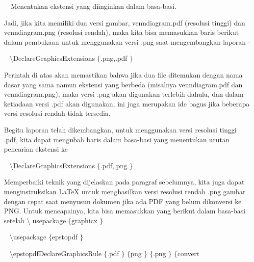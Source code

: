 \noindent 
 $  $ $  $ $  $ $  $Menentukan ekstensi yang diinginkan dalam basa-basi. \par
\vspace{12pt}
\noindent 
Jadi, jika kita memiliki dua versi gambar, venndiagram.pdf (resolusi tinggi) dan venndiagram.png (resolusi rendah), maka kita bisa memasukkan baris berikut dalam pembukaan untuk menggunakan versi .png saat mengembangkan laporan - \par
\vspace{28pt}
\noindent 
~  $  \setminus $DeclareGraphicsExtensions $  \{  $.png,.pdf $  \}  $ \par
\noindent 
Perintah di atas akan memastikan bahwa jika dua file ditemukan dengan nama dasar yang sama namun ekstensi yang berbeda (misalnya venndiagram.pdf dan venndiagram.png), maka versi .png akan digunakan terlebih dahulu, dan dalam ketiadaan versi .pdf akan digunakan, ini juga merupakan ide bagus jika beberapa versi resolusi rendah tidak tersedia. \par
\vspace{12pt}
\noindent 
Begitu laporan telah dikembangkan, untuk menggunakan versi resolusi tinggi .pdf, kita dapat mengubah baris dalam basa-basi yang menentukan urutan pencarian ekstensi ke \par
\vspace{12pt}
\vspace{16pt}
\noindent 
~  $  \setminus $DeclareGraphicsExtensions $  \{  $.pdf,.png $  \}  $ \par
\vspace{12pt}
\vspace{12pt}
\vspace{16pt}
\noindent 
Memperbaiki teknik yang dijelaskan pada paragraf sebelumnya, kita juga dapat menginstruksikan LaTeX untuk menghasilkan versi resolusi rendah .png gambar dengan cepat saat menyusun dokumen jika ada PDF yang belum dikonversi ke PNG. Untuk mencapainya, kita bisa memasukkan yang berikut dalam basa-basi setelah  $  \setminus $ usepackage  $  \{  $graphicx $  \}  $ \par
\vspace{16pt}
\noindent 
~  $  \setminus $usepackage $  \{  $epstopdf $  \}  $ \par
\vspace{12pt}
\noindent 
~  $  \setminus $epstopdfDeclareGraphicsRule $  \{  $.pdf $  \}  $ $  \{  $png $  \}  $ $  \{  $.png $  \}  $ $  \{  $convert \par
\vspace{12pt}
\noindent 
